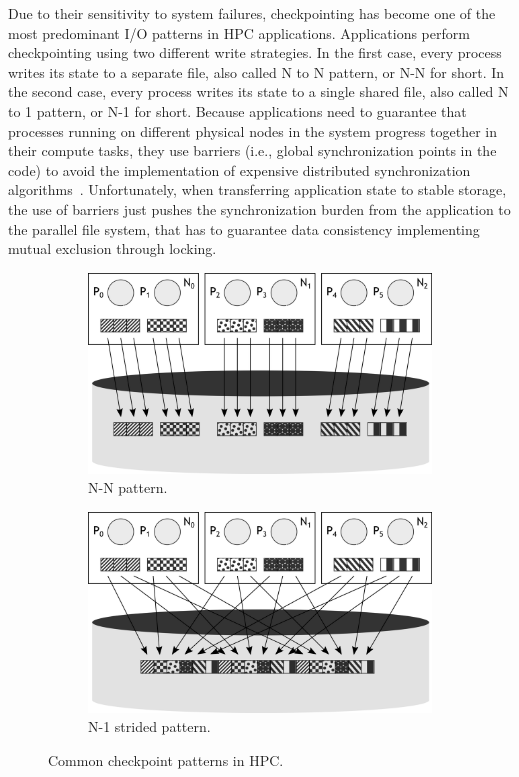 Due to their sensitivity to system failures, checkpointing has become one of the most predominant I/O patterns in HPC applications. Applications perform checkpointing using two different write strategies. In the first case, 
every process writes its state to a separate file, also called N to N pattern, or N-N for short. In the second case, every process writes its state to a single shared file, also called N to 1 pattern, or N-1 for short. 
Because applications need to guarantee that processes running on different physical nodes in the system progress together in their compute tasks, they use barriers (i.e., global synchronization points in the code) to avoid 
the implementation of expensive distributed synchronization algorithms~\cite{Lamport1978}. Unfortunately, when transferring application state to stable storage, the use of barriers just pushes the synchronization burden 
from the application to the parallel file system, that has to guarantee data consistency implementing mutual exclusion through locking.

\begin{figure}[!htb]
  \centering
  \begin{subfigure}[t]{0.46\textwidth}
  \includegraphics[width=\textwidth]{figures/checkpoint-n-n}
  \caption{N-N pattern.}
  \label{figure: checkpoint-n-n}
  \end{subfigure}
  \begin{subfigure}[t]{0.46\textwidth}
  \includegraphics[width=\textwidth]{figures/checkpoint-n-1}
  \caption{N-1 strided pattern.}
  \label{figure: checkpoint-n-1}
  \end{subfigure}
  \caption{Common checkpoint patterns in HPC.}
  \label{figure: checkpoint}
\end{figure}

